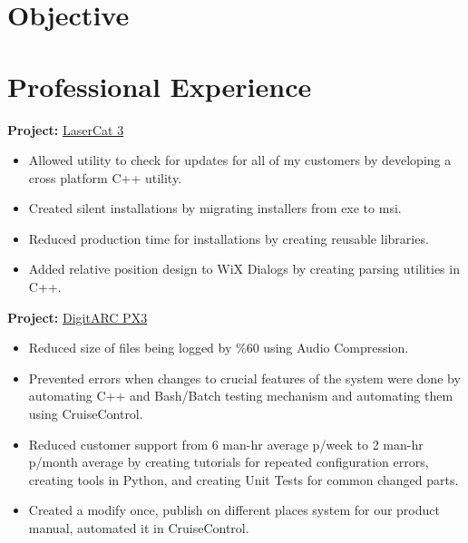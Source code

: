 \documentclass{scrartcl}
\begin{document}
\begin{minipage}[t]{0.69\textwidth}
	\section*{Objective}
		
		
\section*{Professional Experience}
	\textbf{Project:} \href{http://www.epicor.com/Products/Pages/Epicor-LaserCat-3.aspx}{LaserCat 3}
	 \begin{itemize}[noitemsep]
		\item Allowed utility to check for updates for all of my customers by developing a cross platform C++ utility.
		\item Created silent installations by migrating installers from exe to msi.
		\item Reduced production time for installations by creating reusable libraries.
		\item Added relative position design to WiX Dialogs by creating parsing utilities in C++.
	 \end{itemize}

	\textbf{Project:} \href{http://amige.com/meltshops_technological_controls_digitarc_px3.html}{DigitARC PX3}
	\begin{itemize}[noitemsep]
		\item Reduced size of files being logged by \%60 using Audio Compression.
		\item Prevented errors when changes to crucial features of the system were done by automating C++ and Bash/Batch testing mechanism and automating them using CruiseControl. 
		\item Reduced customer support from 6 man-hr average p/week to 2 man-hr p/month average by creating tutorials for repeated configuration errors, creating tools in Python, and creating Unit Tests for common changed parts.
		\item Created a modify once, publish on different places system for our product manual, automated it in CruiseControl.
	\end{itemize}
	
\end{minipage}
\hfill
\end{document}
